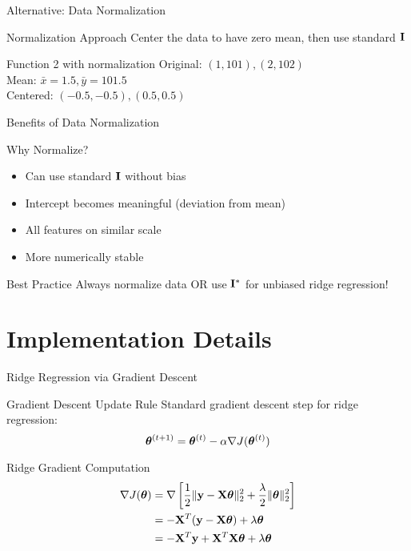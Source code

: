 \documentclass{beamer}
\begin{document}
\begin{frame}{Alternative: Data Normalization}
\begin{theorembox}{Normalization Approach}
Center the data to have zero mean, then use standard $\mathbf{I}$
\end{theorembox}

\begin{codebox}{Function 2 with normalization}
Original: $(1,101), (2,102)$ \\
Mean: $\bar{x} = 1.5, \bar{y} = 101.5$ \\
Centered: $(-0.5, -0.5), (0.5, 0.5)$
\end{codebox}
\end{frame}

\begin{frame}{Benefits of Data Normalization}
\begin{keypointsbox}{Why Normalize?}
\begin{itemize}
\item Can use standard $\mathbf{I}$ without bias
\item Intercept becomes meaningful (deviation from mean)
\item All features on similar scale
\item More numerically stable
\end{itemize}
\end{keypointsbox}

\begin{alertbox}{Best Practice}
Always normalize data OR use $\mathbf{I}^*$ for unbiased ridge regression!
\end{alertbox}
\end{frame}

\section{Implementation Details}

\begin{frame}{Ridge Regression via Gradient Descent}
\begin{theorembox}{Gradient Descent Update Rule}
Standard gradient descent step for ridge regression:
$$\boldsymbol{\theta}^{(t+1)} = \boldsymbol{\theta}^{(t)} - \alpha \nabla J(\boldsymbol{\theta}^{(t)})$$
\end{theorembox}
\pause

\begin{codebox}{Ridge Gradient Computation}
\begin{align}
\nabla J(\boldsymbol{\theta}) &= \nabla \left[\frac{1}{2}\|\mathbf{y}-\mathbf{X}\boldsymbol{\theta}\|_2^2 + \frac{\lambda}{2}\|\boldsymbol{\theta}\|_2^2\right] \\
&= -\mathbf{X}^T(\mathbf{y}-\mathbf{X}\boldsymbol{\theta}) + \lambda\boldsymbol{\theta} \\
&= -\mathbf{X}^T\mathbf{y} + \mathbf{X}^T\mathbf{X}\boldsymbol{\theta} + \lambda\boldsymbol{\theta}
\end{align}
\end{codebox}
\end{frame}
\end{document}
